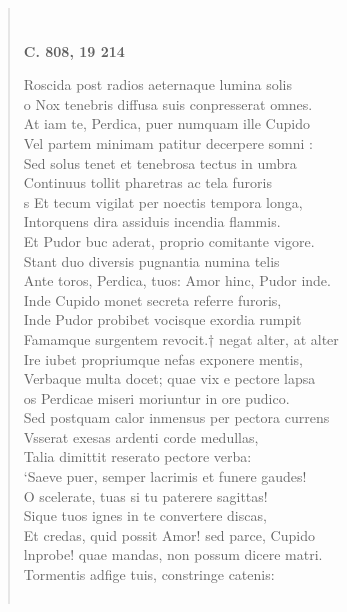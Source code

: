 \documentclass[11pt, a4paper]{report}
\begin{document}
\begin{verse}
        ﻿\pagebreak 
    \begin{center} \textbf{C. 808, 19 214} \end{center} \marginpar{[293]} Roscida post radios aeternaque lumina solis \\ o Nox tenebris diffusa suis conpresserat omnes. \\ At iam te, Perdica, puer numquam ille Cupido \\ Vel partem minimam patitur decerpere  \lbrack somni \rbrack : \\ Sed solus tenet et tenebrosa tectus in umbra \\ Continuus tollit pharetras ac tela furoris \\ s Et tecum vigilat per noectis tempora longa, \\ Intorquens dira assiduis incendia flammis. \\ Et Pudor buc aderat, proprio comitante vigore. \\ Stant duo diversis pugnantia numina telis \\ Ante toros, Perdica, tuos: Amor hinc, Pudor inde. \\ Inde Cupido monet secreta referre furoris, \\ Inde Pudor probibet vocisque \rbrack  exordia rumpit \\ Famamque surgentem revocit.† negat alter, at alter \\ Ire iubet propriumque nefas exponere mentis, \\ Verbaque multa docet; quae vix e pectore lapsa \\ os Perdicae miseri moriuntur in ore pudico. \\ Sed postquam calor inmensus per pectora currens \\ Vsserat exesas ardenti corde medullas, \\ Talia dimittit reserato pectore verba: \\ ‘Saeve puer, semper lacrimis et funere gaudes! \\ O scelerate, tuas si tu paterere sagittas! \\ Sique tuos ignes in te convertere discas, \\ Et credas, quid possit Amor! sed parce, Cupido \\ lnprobe! quae mandas, non possum dicere matri. \\ Tormentis adfige tuis, constringe catenis: \\ 
        ﻿\pagebreak 

\end{verse}
\end{document}
